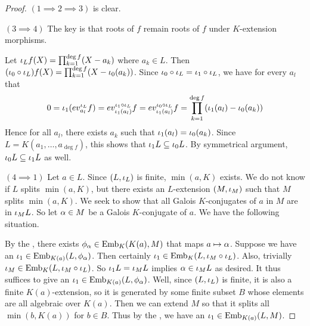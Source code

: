 \documentclass[main.tex]{subfiles}
\begin{document}
\begin{proof} $(1 \implies 2 \implies 3)$ is clear. 

  $(3 \implies 4)$ The key is that roots of $f$ remain roots of $f$
  under $K$-extension morphisms. 

  Let $\iota_L f(X) = \prod_{k = 1}^{\deg f} (X - a_k)$
  where $a_k \in L$.
  Then $(\iota_0 \circ \iota_L) f(X) = \prod_{k = 1}^{\deg f} (X - \iota_0(a_k)) $. 
  Since $\iota_0 \circ \iota_L = \iota_1 \circ \iota_L$, 
  we have for every $a_l$ that \[
    0 = \iota_1 (ev_{a_l}^{\iota_L} f) 
    = ev_{\iota_1(a_l)}^{\iota_1 \circ \iota_L} f
    = ev_{\iota_1(a_l)}^{\iota_0 \circ \iota_L} f
    = \prod_{k = 1}^{\deg f} (\iota_1(a_l) - \iota_0(a_k))
  \] 
  Hence for all $a_l$, 
  there exists $a_k$ such that $\iota_1(a_l) = \iota_0(a_k)$.
  Since $L = K(a_1,\dots,a_{\deg f})$, 
  this shows that $\iota_1 L \subseteq \iota_0 L$.
  By symmetrical argument, $\iota_0 L \subseteq \iota_1 L$ as well. 

  $(4 \implies 1)$ Let $a \in L$. 
  Since $(L,\iota_L)$ is finite, $\min(a,K)$ exists.
  We do not know if $L$ splits $\min(a,K)$,
  but there exists an $L$-extension $(M,\iota_M)$ such that 
  $M$ splits $\min(a,K)$.
  We seek to show that all Galois $K$-conjugates of $a$ in $M$ are in $\iota_M L$.
  So let $\alpha \in M$ be a Galois $K$-conjugate of $a$. 
  We have the following situation. 
  \begin{figure} [H]
    \centering
  \end{figure}
  By the , 
  there exists $\phi_\alpha \in \mathrm{Emb}_{K}(K(a), M)$
  that maps $a \mapsto \alpha$. 
  Suppose we have an $\iota_1 \in \mathrm{Emb}_{K(a)}(L, \phi_\alpha)$.
  Then certainly $\iota_1 \in \mathrm{Emb}_{K}(L, \iota_M \circ \iota_L)$. 
  Also, trivially $\iota_M \in \mathrm{Emb}_{K}(L, \iota_M \circ \iota_L)$. 
  So $\iota_1 L = \iota_M L$ implies $\alpha \in \iota_M L$ as desired. 
  It thus suffices to give an $\iota_1 \in \mathrm{Emb}_{K(a)}(L, \phi_\alpha)$. 
  Well, since $(L,\iota_L)$ is finite, it is also a finite $K(a)$-extension, 
  so it is generated by some finite subset $B$
  whose elements are all algebraic over $K(a)$. 
  Then we can extend $M$ so that it splits all $\min(b,K(a))$ for $b \in B$. 
  Thus by the , 
  we have an $\iota_1 \in \mathrm{Emb}_{K(a)}(L, M)$. 
\end{proof}
\end{document}
